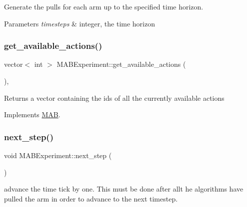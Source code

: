 Generate the pulls for each arm up to the specified time horizon. 


\begin{DoxyParams}{Parameters}
{\em timesteps} & integer, the time horizon \\
\hline
\end{DoxyParams}
\mbox{\label{class_m_a_b_experiment_af64386f9138dcd31873d9218b7adf6fb}} 
\subsubsection{\texorpdfstring{get\+\_\+available\+\_\+actions()}{get\_available\_actions()}}
{\footnotesize\ttfamily vector$<$ int $>$ M\+A\+B\+Experiment\+::get\+\_\+available\+\_\+actions (\begin{DoxyParamCaption}{ }\end{DoxyParamCaption})\hspace{0.3cm}{\ttfamily [override]}, {\ttfamily [virtual]}}

\begin{DoxyReturn}{Returns}
a vector containing the ids of all the currently available actions 
\end{DoxyReturn}


Implements \mbox{\hyperlink{class_m_a_b_a8323d26ac3720c2f3949298d5f7cf60f}{M\+AB}}.

\mbox{\label{class_m_a_b_experiment_a0159e6c16372d282c0e2afd711da22c8}} 
\subsubsection{\texorpdfstring{next\+\_\+step()}{next\_step()}}
{\footnotesize\ttfamily void M\+A\+B\+Experiment\+::next\+\_\+step (\begin{DoxyParamCaption}{ }\end{DoxyParamCaption})}



advance the time tick by one. This must be done after allt he algorithms have pulled the arm in order to advance to the next timestep. 

